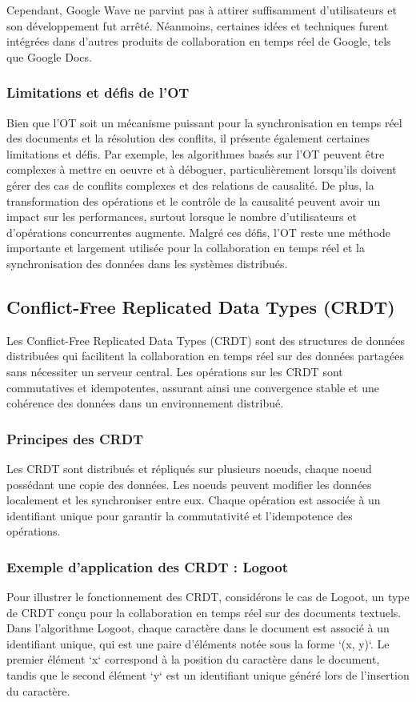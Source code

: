 Cependant, Google Wave ne parvint pas à attirer suffisamment d'utilisateurs et son développement fut arrêté. Néanmoins, certaines idées et techniques furent intégrées dans d'autres produits de collaboration en temps réel de Google, tels que Google Docs.

\subsubsection{Limitations et défis de l'OT}
Bien que l'OT soit un mécanisme puissant pour la synchronisation en temps réel des documents et la résolution des conflits, il présente également certaines limitations et défis. Par exemple, les algorithmes basés sur l'OT peuvent être complexes à mettre en oeuvre et à déboguer, particulièrement lorsqu'ils doivent gérer des cas de conflits complexes et des relations de causalité. De plus, la transformation des opérations et le contrôle de la causalité peuvent avoir un impact sur les performances, surtout lorsque le nombre d'utilisateurs et d'opérations concurrentes augmente. Malgré ces défis, l'OT reste une méthode importante et largement utilisée pour la collaboration en temps réel et la synchronisation des données dans les systèmes distribués.

\subsection{Conflict-Free Replicated Data Types (CRDT)}
Les Conflict-Free Replicated Data Types (CRDT) sont des structures de données distribuées qui facilitent la collaboration en temps réel sur des données partagées sans nécessiter un serveur central. Les opérations sur les CRDT sont commutatives et idempotentes, assurant ainsi une convergence stable et une cohérence des données dans un environnement distribué.

\subsubsection{Principes des CRDT}
Les CRDT sont distribués et répliqués sur plusieurs noeuds, chaque noeud possédant une copie des données. Les noeuds peuvent modifier les données localement et les synchroniser entre eux. Chaque opération est associée à un identifiant unique pour garantir la commutativité et l'idempotence des opérations.

\subsubsection{Exemple d'application des CRDT : Logoot}
Pour illustrer le fonctionnement des CRDT, considérons le cas de Logoot, un type de CRDT conçu pour la collaboration en temps réel sur des documents textuels. Dans l'algorithme Logoot, chaque caractère dans le document est associé à un identifiant unique, qui est une paire d'éléments notée sous la forme `(x, y)`. Le premier élément `x` correspond à la position du caractère dans le document, tandis que le second élément `y` est un identifiant unique généré lors de l'insertion du caractère.

